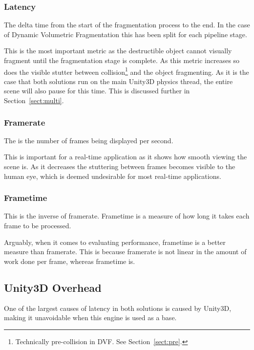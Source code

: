 \subsubsection{Latency}

The delta time from the start of the fragmentation process to the end. In the case of Dynamic Volumetric Fragmentation this has been split for each pipeline stage.

This is the most important metric as the destructible object cannot visually fragment until the fragmentation stage is complete. As this metric increases so does the visible stutter between collision\footnote{Technically pre-collision in DVF. See Section~\ref{sect:pre}.} and the object fragmenting. As it is the case that both solutions run on the main Unity3D physics thread, the entire scene will also pause for this time. This is discussed further in Section~\ref{sect:multi}.

\subsubsection{Framerate}

The is the number of frames being displayed per second.

This is important for a real-time application as it shows how smooth viewing the scene is. As it decreases the stuttering between frames becomes visible to the human eye, which is deemed undesirable for most real-time applications.

\subsubsection{Frametime}

This is the inverse of framerate. Frametime is a measure of how long it takes each frame to be processed.

Arguably, when it comes to evaluating performance, frametime is a better measure than framerate. This is because framerate is not linear in the amount of work done per frame, whereas frametime is.

\subsection{Unity3D Overhead}

\label{sect:over}

One of the largest causes of latency in both solutions is caused by Unity3D, making it unavoidable when this engine is used as a base.

